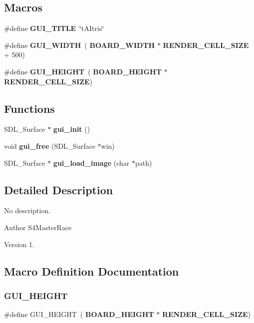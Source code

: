 \subsection*{Macros}
\begin{DoxyCompactItemize}
\item 
\#define \textbf{ G\+U\+I\+\_\+\+T\+I\+T\+LE}~\char`\"{}t\+A\+Itris\char`\"{}
\item 
\#define \textbf{ G\+U\+I\+\_\+\+W\+I\+D\+TH}~(\textbf{ B\+O\+A\+R\+D\+\_\+\+W\+I\+D\+TH} $\ast$ \textbf{ R\+E\+N\+D\+E\+R\+\_\+\+C\+E\+L\+L\+\_\+\+S\+I\+ZE} + 500)
\item 
\#define \textbf{ G\+U\+I\+\_\+\+H\+E\+I\+G\+HT}~(\textbf{ B\+O\+A\+R\+D\+\_\+\+H\+E\+I\+G\+HT} $\ast$ \textbf{ R\+E\+N\+D\+E\+R\+\_\+\+C\+E\+L\+L\+\_\+\+S\+I\+ZE})
\end{DoxyCompactItemize}
\subsection*{Functions}
\begin{DoxyCompactItemize}
\item 
S\+D\+L\+\_\+\+Surface $\ast$ \textbf{ gui\+\_\+init} ()
\item 
void \textbf{ gui\+\_\+free} (S\+D\+L\+\_\+\+Surface $\ast$win)
\item 
S\+D\+L\+\_\+\+Surface $\ast$ \textbf{ gui\+\_\+load\+\_\+image} (char $\ast$path)
\end{DoxyCompactItemize}


\subsection{Detailed Description}
No description. 

\begin{DoxyAuthor}{Author}
S4\+Master\+Race 
\end{DoxyAuthor}
\begin{DoxyVersion}{Version}
1. 
\end{DoxyVersion}


\subsection{Macro Definition Documentation}
\mbox{\label{gui_8h_a31888bbbf18bb7b0e6ef5722451e00db}} 
\subsubsection{G\+U\+I\+\_\+\+H\+E\+I\+G\+HT}
{\footnotesize\ttfamily \#define G\+U\+I\+\_\+\+H\+E\+I\+G\+HT~(\textbf{ B\+O\+A\+R\+D\+\_\+\+H\+E\+I\+G\+HT} $\ast$ \textbf{ R\+E\+N\+D\+E\+R\+\_\+\+C\+E\+L\+L\+\_\+\+S\+I\+ZE})}

